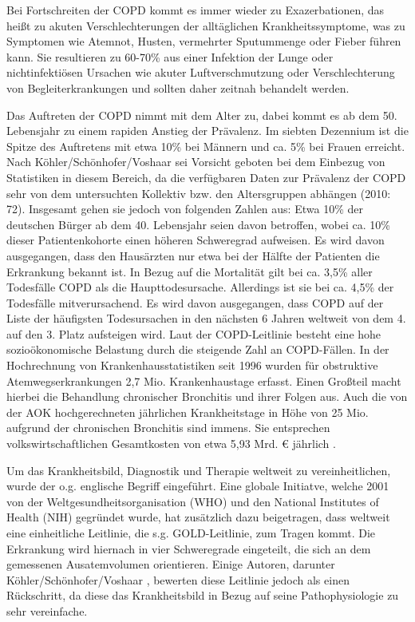 Bei Fortschreiten der COPD kommt es immer wieder zu Exazerbationen, das heißt zu akuten Verschlechterungen der alltäglichen Krankheitssymptome, was zu Symptomen wie Atemnot, Husten, vermehrter Sputummenge oder Fieber führen kann. Sie resultieren zu 60-70\% aus einer Infektion der Lunge oder nichtinfektiösen Ursachen wie akuter Luftverschmutzung oder Verschlechterung von Begleiterkrankungen und sollten daher zeitnah behandelt werden.

Das Auftreten der COPD nimmt mit dem Alter zu, dabei kommt es ab dem 50. Lebensjahr zu einem rapiden Anstieg der Prävalenz. Im siebten Dezennium ist die Spitze des Auftretens mit etwa 10\% bei Männern und ca. 5\% bei Frauen erreicht\autocite[vgl.][153]{lorenz2009}. Nach Köhler/Schönhofer/Voshaar sei Vorsicht geboten bei dem Einbezug von Statistiken in diesem Bereich, da die verfügbaren Daten zur Prävalenz der COPD sehr von dem untersuchten Kollektiv bzw. den Altersgruppen abhängen (2010: 72). Insgesamt gehen sie jedoch von folgenden Zahlen aus: Etwa 10\% der deutschen Bürger ab dem 40. Lebensjahr seien davon betroffen, wobei ca. 10\% dieser Patientenkohorte einen höheren Schweregrad aufweisen. Es wird davon ausgegangen, dass den Hausärzten nur etwa bei der Hälfte der Patienten die Erkrankung bekannt ist.
In Bezug auf die Mortalität gilt bei ca. 3,5\% aller Todesfälle COPD als die Haupttodesursache. Allerdings ist sie bei ca. 4,5\% der Todesfälle mitverursachend. Es wird davon ausgegangen, dass COPD auf der Liste der häufigsten Todesursachen in den nächsten 6 Jahren weltweit von dem 4. auf den 3. Platz aufsteigen wird.
Laut der COPD-Leitlinie besteht eine hohe sozioökonomische Belastung durch die steigende Zahl an COPD-Fällen. In der Hochrechnung von Krankenhausstatistiken seit 1996 wurden für obstruktive Atemwegserkrankungen 2,7 Mio. Krankenhaustage erfasst. Einen Großteil macht hierbei die Behandlung chronischer Bronchitis und ihrer Folgen aus. Auch die von der AOK hochgerechneten jährlichen Krankheitstage in Höhe von 25 Mio. aufgrund der chronischen Bronchitis sind immens. Sie entsprechen volkswirtschaftlichen Gesamtkosten von etwa 5,93 Mrd. € jährlich \autocite[vgl.][e4]{vogelmeier2007}.

Um das Krankheitsbild, Diagnostik und Therapie weltweit zu vereinheitlichen, wurde der o.g. englische Begriff eingeführt. Eine globale Initiatve, welche 2001 von der Weltgesundheitsorganisation (WHO) und den National Institutes of Health (NIH) gegründet wurde, hat zusätzlich dazu beigetragen, dass weltweit eine einheitliche Leitlinie, die s.g. GOLD-Leitlinie, zum Tragen kommt. Die Erkrankung wird hiernach in vier Schweregrade eingeteilt, die sich an dem gemessenen Ausatemvolumen orientieren. Einige Autoren, darunter Köhler/Schönhofer/Voshaar \autocite[vgl.][75]{koehler2010}, bewerten diese Leitlinie jedoch als einen Rückschritt, da diese das Krankheitsbild in Bezug auf seine Pathophysiologie zu sehr vereinfache.

